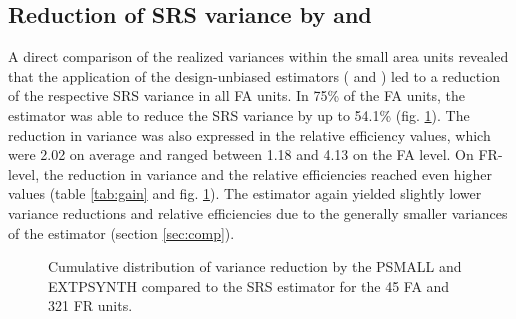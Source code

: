 \subsection{Reduction of SRS variance by \psmall{} and \extpsynth{}}
\label{sec:gain_eval}

A direct comparison of the realized variances within the small area units revealed that the application of the design-unbiased estimators (\psmall{} and \extpsynth{}) led to a reduction of the respective SRS variance in all FA units. In 75\% of the FA units, the \extpsynth{} estimator was able to reduce the SRS variance by up to 54.1\% (fig. \ref{fig:gain}). The reduction in variance was also expressed in the relative efficiency values, which were 2.02 on average and ranged between 1.18 and 4.13 on the FA level. On FR-level, the reduction in variance and the relative efficiencies reached even higher values (table \ref{tab:gain} and fig. \ref{fig:gain}). The \psmall{} estimator again yielded slightly lower variance reductions and relative efficiencies due to the generally smaller variances of the \extpsynth{} estimator (section \ref{sec:comp}).

\begin{figure}[H]
	\centering
	\caption{Cumulative distribution of variance reduction by the PSMALL and EXTPSYNTH compared to the SRS estimator for the  45 FA and 321 FR units.}
	\label{fig:gain}
\end{figure}

